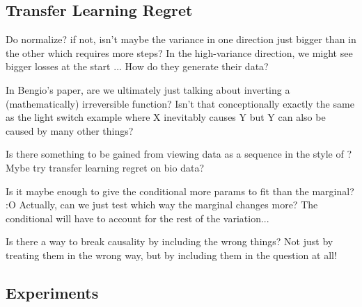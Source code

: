\documentclass{article}
\begin{document}
\subsection{Transfer Learning Regret}
Do \cite{bengio2019meta} normalize? if not, isn't maybe the variance in one direction just bigger than in the other which requires more steps? In the high-variance direction, we might see bigger losses at the start $\dots$
How do they generate their data?

In Bengio's paper, are we ultimately just talking about inverting a (mathematically) irreversible function?
Isn't that conceptionally exactly the same as the light switch example where X inevitably causes Y but Y can also be caused by many other things?

Is there something to be gained from viewing data as a sequence in the style of \cite{bengio2019meta}? Mybe try transfer learning regret on bio data?

Is it maybe enough to give the conditional more params to fit than the marginal? :O
Actually, can we just test which way the marginal changes more? The conditional will have to account for the rest of the variation...

Is there a way to break causality by including the wrong things? Not just by treating them in the wrong way, but by including them in the question at all!

\subsection{Experiments}
\end{document}

